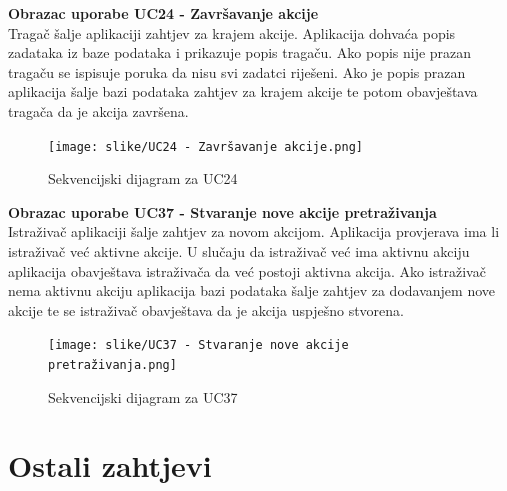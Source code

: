 				\eject

				\noindent
				\textbf{Obrazac uporabe UC24 - Završavanje akcije}\\

				\noindent
				Tragač šalje aplikaciji zahtjev za krajem akcije.
        				Aplikacija dohvaća popis zadataka iz baze podataka i prikazuje popis tragaču.
        				Ako popis nije prazan tragaču se ispisuje poruka da nisu svi zadatci riješeni.
				        Ako je popis prazan aplikacija šalje bazi podataka zahtjev za krajem akcije
        				te potom obavještava tragača da je akcija završena.

				

				\begin{figure}[H]
					\texttt{[image: slike/UC24 - Završavanje akcije.png]} %
					\centering
					\caption{Sekvencijski dijagram za UC24}
					\label{fig:UC24 - Završavanje akcije}
				\end{figure}

				\eject

				\noindent
				\textbf{Obrazac uporabe UC37 - Stvaranje nove akcije pretraživanja}\\

				\noindent
				Istraživač aplikaciji šalje zahtjev za novom akcijom.
				        Aplikacija provjerava ima li istraživač već aktivne akcije.
        				U slučaju da istraživač već ima aktivnu akciju aplikacija obavještava istraživača da već postoji aktivna akcija.
        				Ako istraživač nema aktivnu akciju aplikacija bazi podataka šalje zahtjev za dodavanjem nove akcije te se
        				istraživač obavještava da je akcija uspješno stvorena.

				

				\begin{figure}[H]
					\texttt{[image: slike/UC37 - Stvaranje nove akcije pretraživanja.png]} %
					\centering
					\caption{Sekvencijski dijagram za UC37}
					\label{fig:UC37 - Stvaranje nove akcije pretraživanja}
				\end{figure}

				\eject
	
		\section{Ostali zahtjevi}

